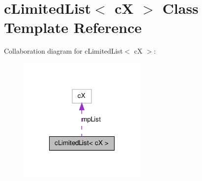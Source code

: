 \hypertarget{classc_limited_list}{
\section{cLimitedList$<$ cX $>$ Class Template Reference}
\label{classc_limited_list}
}


Collaboration diagram for cLimitedList$<$ cX $>$:
\nopagebreak
\begin{figure}[H]
\begin{center}
\leavevmode
\includegraphics[width=178pt]{classc_limited_list__coll__graph}
\end{center}
\end{figure}
